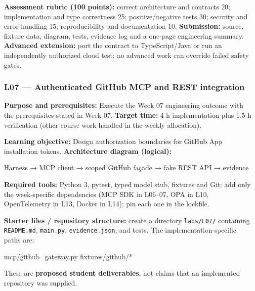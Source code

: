 \documentclass[
  10pt,
]{article}
\newenvironment{Shaded}{\begin{snugshade}}{\end{snugshade}}
\newcommand{\NormalTok}[1]{#1}
\begin{document}
\textbf{Assessment rubric (100 points):} correct architecture and
contracts 20; implementation and type correctness 25; positive/negative
tests 30; security and error handling 15; reproducibility and
documentation 10. \textbf{Submission:} source, fixture data, diagram,
tests, evidence log and a one-page engineering summary. \textbf{Advanced
extension:} port the contract to TypeScript/Java or run an independently
authorized cloud test; no advanced work can override failed safety
gates.

\subsubsection{L07 --- Authenticated GitHub MCP and REST
integration}\label{l07-authenticated-github-mcp-and-rest-integration}

\textbf{Purpose and prerequisites:} Execute the Week 07 engineering
outcome with the prerequisites stated in Week 07. \textbf{Target time:}
4 h implementation plus 1.5 h verification (other course work handled in
the weekly allocation).

\textbf{Learning objective:} Design authorization boundaries for GitHub
App installation tokens. \textbf{Architecture diagram (logical):}

\begin{Shaded}
\begin{Highlighting}[]
\NormalTok{Harness → MCP client → scoped GitHub façade → fake REST}
\NormalTok{API → evidence}
\end{Highlighting}
\end{Shaded}

\textbf{Required tools:} Python 3, pytest, typed model stub, fixtures
and Git; add only the week-specific dependencies (MCP SDK in L06--07,
OPA in L10, OpenTelemetry in L13, Docker in L14); pin each one in the
lockfile.

{\raggedright \textbf{Starter files / repository structure:} create a directory
\texttt{labs/\allowbreak L07/} containing \texttt{README.md}, \texttt{main.py},
\texttt{evidence.json}, and tests. The implementation-specific paths
are:\par}

\begin{Shaded}
\begin{Highlighting}[]
\NormalTok{mcp/github\_gateway.py}
\NormalTok{fixtures/github/*}
\end{Highlighting}
\end{Shaded}

These are \textbf{proposed student deliverables}, not claims that an
implemented repository was supplied.
\end{document}
